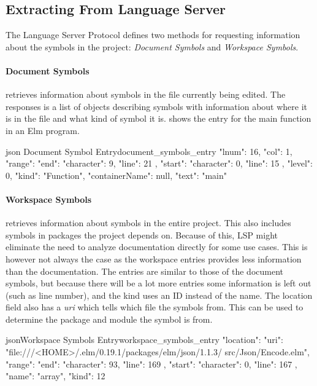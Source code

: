 \documentclass[../thesis.tex]{subfiles}
\begin{document}
\subsection{Extracting From Language Server}%
The Language Server Protocol defines two methods for requesting information about the symbols in the project: \textit{Document Symbols} and \textit{Workspace Symbols}.

\paragraph{Document Symbols} retrieves information about symbols in the file currently being edited.
The responses is a list of objects describing symbols with information about where it is in the file
and what kind of symbol it is.  shows the entry for the main function in an Elm program.
\begin{code}{ json }{Document Symbol Entry}{document_symbols_entry}
{
  "lnum": 16,
  "col": 1,
  "range": {
    "end": { "character": 9, "line": 21 },
    "start": { "character": 0, "line": 15 }
  },
  "level": 0,
  "kind": "Function",
  "containerName": null,
  "text": "main"
} 
\end{code}

\paragraph{Workspace Symbols} retrieves information about symbols in the entire project.
This also includes symbols in packages the project depends on.
Because of this, LSP might eliminate the need to analyze documentation directly for some use cases.
This is however not always the case as the workspace entries provides less information than the documentation.
The entries are similar to those of the document symbols, but because there will be a lot more entries some
information is left out (such as line number), and the kind uses an ID instead of the name.
The location field also has a \textit{uri} which tells which file the symbols from.
This can be used to determine the package and module the symbol is from.
\begin{code}{json}{Workspace Symbols Entry}{workspace_symbols_entry}
{ 
  "location": {
  "uri":
    "file:///<HOME>/.elm/0.19.1/packages/elm/json/1.1.3/
                                    src/Json/Encode.elm",
  "range": {
    "end": { "character": 93, "line": 169 },
    "start": { "character": 0, "line": 167 }
    }
  },
  "name": "array",
  "kind": 12 
}
\end{code} 
\end{document}
